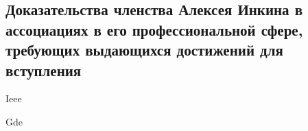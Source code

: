 \subsection{%
    Доказательства членства Алексея Инкина в ассоциациях в его профессиональной сфере,
    требующих выдающихся достижений для вступления%
}
\label{subsec:Associations}

{Ieee}


{Gde}

